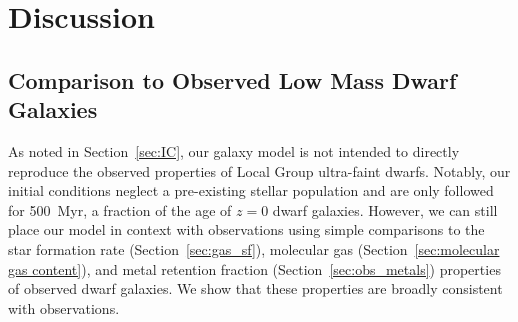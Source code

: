 \documentclass[twocolumn]{aastex61}
\begin{document}



\section{Discussion}
\label{sec:discussion}

\subsection{Comparison to Observed Low Mass Dwarf Galaxies}
\label{sec:observation}

As noted in Section~\ref{sec:IC}, our galaxy model is not intended to directly reproduce the observed properties of Local Group ultra-faint dwarfs. Notably, our initial conditions neglect a pre-existing stellar population and are only followed for 500~Myr, a fraction of the age of $z = 0$ dwarf galaxies. However, we can still place our model in context with observations using simple comparisons to the star formation rate (Section~\ref{sec:gas_sf}), molecular gas (Section~\ref{sec:molecular gas content}), and metal retention fraction (Section~\ref{sec:obs_metals}) properties of observed dwarf galaxies. We show that these properties are broadly consistent with observations. 
\end{document}
